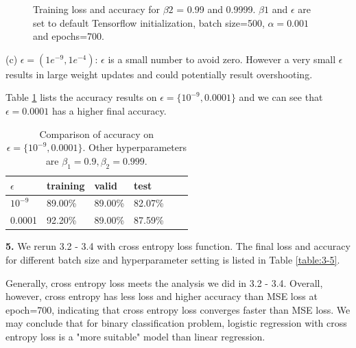 \documentclass[12pt]{article}
\newenvironment{problem}[2][Problem]{\begin{trivlist}
\item[\hskip \labelsep {\bfseries #1}\hskip \labelsep {\bfseries #2.}]}{\end{trivlist}}
\begin{document}
\begin{problem}{3}
\begin{figure}[!htb]
\caption{Training loss and accuracy for $\beta2$ = 0.99 and 0.9999. 
\newline
$\beta1$ and $\epsilon$ are set to default Tensorflow initialization, batch size=500, $\alpha=0.001$ and epochs=700.  }\label{fig:3-4-2}
\end{figure}

\bigskip
\newpage
(c) $\epsilon = (1e^{-9}, 1e^{-4})$: $\epsilon$ is a small number to avoid zero. However a very small $\epsilon$ results in large weight updates and could potentially result overshooting.

Table \ref{table:3-4-c} lists the accuracy results on $\epsilon=\{10^{-9}, 0.0001\}$ and we can see that $\epsilon=0.0001$ has a higher final accuracy.

\begin{table}[!htb]
\center
\begin{tabular}{|l|l|l|l|l|l|}
\hline
$\epsilon$ & training & valid   & test     \\ \hline
$10^{-9}$   & 89.00\%  & 89.00\% & 82.07\%  \\ \hline
0.0001    & 92.20\%  & 89.00\% & 87.59\%  \\ \hline
\end{tabular}
\caption{Comparison of accuracy on $\epsilon=\{10^{-9}, 0.0001\}$. Other hyperparameters are $\beta_1=0.9, \beta_2=0.999$.}
\label{table:3-4-c}
\end{table}

\newpage
\newpage
\newpage
\bigskip
\bigskip
\bigskip
\bigskip
\newpage
\newpage
\newpage



\textbf{5. } We rerun 3.2 - 3.4 with cross entropy loss function. The final loss and accuracy for different batch size and hyperparameter setting is listed in Table \ref{table:3-5}.

Generally, cross entropy loss meets the analysis we did in 3.2 - 3.4. Overall, however, cross entropy has less loss and higher accuracy than MSE loss at epoch=700, indicating that cross entropy loss converges faster than MSE loss. We may conclude that for binary classification problem, logistic regression with cross entropy loss is a "more suitable" model than linear regression.
 

\end{problem}
\end{document}
